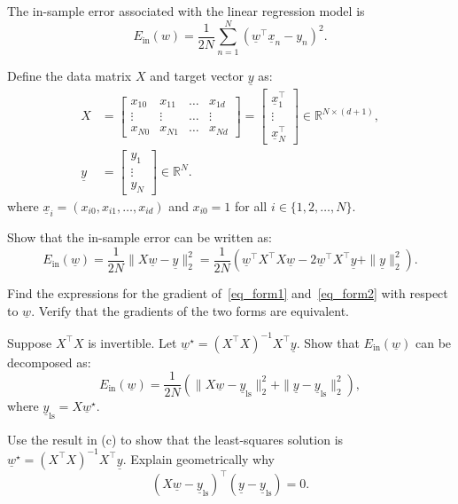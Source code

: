 \documentclass{article}
\newcommand{\setR}{\mathbb{R}}
\renewcommand{\vec}[1]{\underline{#1}}
\newcommand{\vecw}{\vec{w}}
\newcommand{\vecx}{\vec{x}}
\newcommand{\vecy}{\vec{y}}
\theoremstyle{definition}
\begin{document}
\begin{question}[start=0]
	The in-sample error associated with the linear regression model is
	\begin{equation}\label{eq_form1}
		E_{\text{in}}(w) = \frac{1}{2N} \sum_{n=1}^N (\vecw^\top \vecx_n - y_n)^2.
	\end{equation}
	
	Define the data matrix $X$ and target vector $\vec{y}$ as:
	\begin{align*}
		X &= \begin{bmatrix}
		x_{10} & x_{11} & \dots & x_{1d} \\
		\vdots & \vdots & \dots & \vdots \\
		x_{N0} & x_{N1} & \dots & x_{Nd}
	\end{bmatrix}=\begin{bmatrix}
	\vecx_{1}^\top \\
	\vdots \\
	\vecx_{N}^\top
	\end{bmatrix} \in \setR^{N \times (d+1)},\\
	\vec{y} &= \begin{bmatrix}
		y_1 \\
		\vdots \\
		y_N
	\end{bmatrix}\in \setR^{N}.
\end{align*}
where $\vecx_{i} = (x_{i0}, x_{i1}, \ldots, x_{id})$ and $x_{i0}=1$ for all $i \in \{1, 2, \ldots, N\}$.
	\begin{question}
		\item Show that the in-sample error can be written as:
		\begin{equation}\label{eq_form2}
			E_{\text{in}}(\vecw) = \frac{1}{2N} \|X\vecw - \vecy\|_2^2 = \frac{1}{2N}\left(\vecw^\top X^\top X \vecw - 2\vecw^\top X^\top \vecy + \|\vecy\|_2^2\right).
		\end{equation}

		\item Find the expressions for the gradient of~\eqref{eq_form1} and~\eqref{eq_form2} with respect to $\vecw$. Verify that the gradients of the two forms are equivalent.
		
		\item Suppose $X^\top X$ is invertible. Let $\vecw^\star = (X^\top X)^{-1} X^\top \vecy$. Show that $E_{\text{in}}(\vecw)$ can be decomposed as:
		\begin{equation*}
		E_{\text{in}}(\vecw) = \frac{1}{2N}\left(\|X \vecw - \vecy_{\text{ls}}\|_2^2 + \|\vecy - \vecy_{\text{ls}}\|_2^2\right),
		\end{equation*}
		where $\vecy_{\text{ls}} = X \vecw^\star$.
		
		\item Use the result in (c) to show that the least-squares solution is $\vecw^\star = (X^\top X)^{-1} X^\top \vecy$. Explain geometrically why $$(X \vecw - \vecy_{\text{ls}})^\top (\vecy - \vecy_{\text{ls}}) = 0.$$
	\end{question}
	
	
\end{question}
\end{document}
